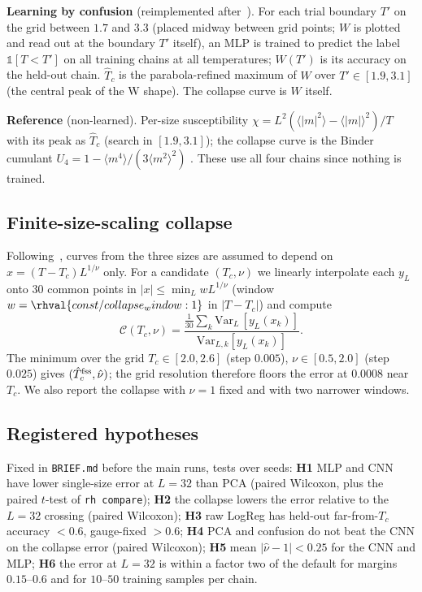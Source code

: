 \textbf{Learning by confusion} (reimplemented after~\cite{nieuwenburg2016learning}). For each trial boundary $T'$ on the grid between $1.7$ and $3.3$ (placed midway between grid points; $W$ is plotted and read out at the boundary $T'$ itself), an MLP is trained to predict the label $\mathbb 1[T<T']$ on all training chains at all temperatures; $W(T')$ is its accuracy on the held-out chain. $\hat T_c$ is the parabola-refined maximum of $W$ over $T'\in[1.9,3.1]$ (the central peak of the W shape). The collapse curve is $W$ itself.

\textbf{Reference} (non-learned). Per-size susceptibility $\chi=L^2(\langle|m|^2\rangle-\langle|m|\rangle^2)/T$ with its peak as $\hat T_c$ (search in $[1.9,3.1]$); the collapse curve is the Binder cumulant $U_4=1-\langle m^4\rangle/(3\langle m^2\rangle^2)$ \cite{binder1981finite}. These use all four chains since nothing is trained.

\subsection{Finite-size-scaling collapse}
Following~\cite{fisher1972scaling,carrasquilla2016machine}, curves from the three sizes are assumed to depend on $x=(T-T_c)L^{1/\nu}$ only. For a candidate $(T_c,\nu)$ we linearly interpolate each $y_L$ onto $30$ common points in $|x|\le\min_L w L^{1/\nu}$ (window $w=\rhval{const/collapse_window:1}$ in $|T-T_c|$) and compute
\begin{equation}
\mathcal C(T_c,\nu)=\frac{\frac{1}{30}\sum_{k}\mathrm{Var}_L\,[y_L(x_k)]}{\mathrm{Var}_{L,k}[y_L(x_k)]}.
\end{equation}
The minimum over the grid $T_c\in[2.0,2.6]$ (step $0.005$), $\nu\in[0.5,2.0]$ (step $0.025$) gives $(\hat T_c^{\rm fss},\hat\nu)$; the grid resolution therefore floors the error at $0.0008$ near $T_c$. We also report the collapse with $\nu=1$ fixed and with two narrower windows.

\subsection{Registered hypotheses}
Fixed in \texttt{BRIEF.md} before the main runs, tests over seeds:
\textbf{H1} MLP and CNN have lower single-size error at $L=32$ than PCA (paired Wilcoxon, plus the paired $t$-test of \texttt{rh compare}); \textbf{H2} the collapse lowers the error relative to the $L=32$ crossing (paired Wilcoxon); \textbf{H3} raw LogReg has held-out far-from-$T_c$ accuracy $<0.6$, gauge-fixed $>0.6$; \textbf{H4} PCA and confusion do not beat the CNN on the collapse error (paired Wilcoxon); \textbf{H5} mean $|\hat\nu-1|<0.25$ for the CNN and MLP; \textbf{H6} the error at $L=32$ is within a factor two of the default for margins $0.15$--$0.6$ and for $10$--$50$ training samples per chain.
